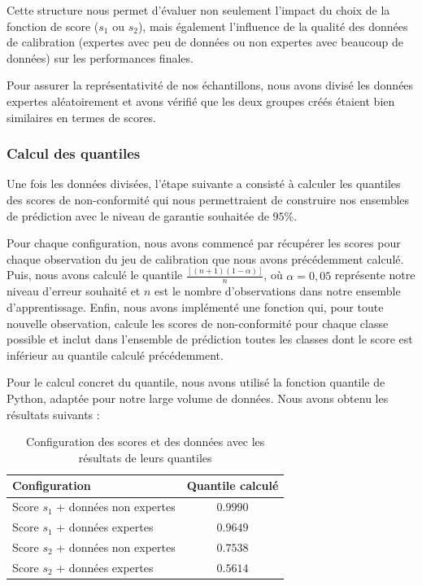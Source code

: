 \documentclass[a4paper,12pt]{article}
\begin{document}
\vspace{0.2cm}

Cette structure nous permet d'évaluer non seulement l'impact du choix de la fonction de score ($s_1$ ou $s_2$), mais également l'influence de la qualité des données de calibration (expertes avec peu de données ou non expertes avec beaucoup de données) sur les performances finales.

\vspace{0.2cm}

Pour assurer la représentativité de nos échantillons, nous avons divisé les données expertes aléatoirement et avons vérifié que les deux groupes créés étaient bien similaires en termes de scores.

\subsubsection{Calcul des quantiles}

Une fois les données divisées, l'étape suivante a consisté à calculer les quantiles des scores de non-conformité qui nous permettraient de construire nos ensembles de prédiction avec le niveau de garantie souhaitée de $95\%$.

\vspace{0.2cm}

Pour chaque configuration, nous avons commencé par récupérer les scores pour chaque observation du jeu de calibration que nous avons précédemment calculé. Puis, nous avons calculé le quantile $\frac{[(n+1)(1 - \alpha)]}{n}$, où $\alpha = 0,05$ représente notre niveau d'erreur souhaité et $n$ est le nombre d'observations dans notre ensemble d'apprentissage. Enfin, nous avons implémenté une fonction qui, pour toute nouvelle observation, calcule les scores de non-conformité pour chaque classe possible et inclut dans l'ensemble de prédiction toutes les classes dont le score est inférieur au quantile calculé précédemment.

\vspace{0.2cm}

Pour le calcul concret du quantile, nous avons utilisé la fonction quantile de Python, adaptée pour notre large volume de données. Nous avons obtenu les résultats suivants : 

\begin{table}[H]
\centering
    \begin{tabular}{|l|c|}
        \hline
        Configuration & Quantile calculé \\
        \hline
        Score $s_1$ + données non expertes & $0.9990$ \\
        Score $s_1$ + données expertes & $0.9649$ \\
        Score $s_2$ + données non expertes & $0.7538$ \\
        Score $s_2$ + données expertes & $0.5614$ \\
        \hline
        \end{tabular}
    \caption{Configuration des scores et des données avec les résultats de leurs quantiles}
    \label{fig: scores et quantiles}
\end{table}
\end{document}
